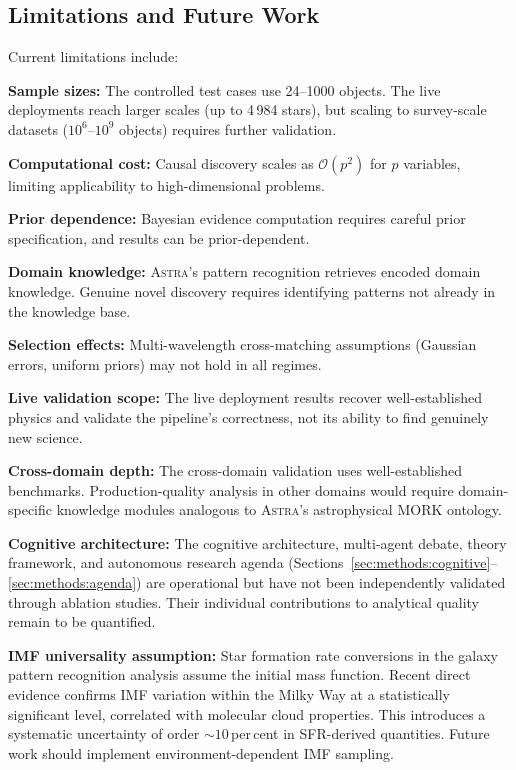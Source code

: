\documentclass[usenatbib]{rasti}
\newcommand{\astra}{\textsc{Astra}\xspace}
\begin{document}
\subsection{Limitations and Future Work}
\label{sec:discussion:limitations}

Current limitations include:
\begin{description}
  \item \textbf{Sample sizes:} The controlled test cases use 24--1000 objects. The live deployments reach larger scales (up to 4\,984 stars), but scaling to survey-scale datasets ($10^{6}$--$10^{9}$ objects) requires further validation.
  \item \textbf{Computational cost:} Causal discovery scales as $\mathcal{O}(p^2)$ for $p$ variables, limiting applicability to high-dimensional problems.
  \item \textbf{Prior dependence:} Bayesian evidence computation requires careful prior specification, and results can be prior-dependent.
  \item \textbf{Domain knowledge:} \astra's pattern recognition retrieves encoded domain knowledge. Genuine novel discovery requires identifying patterns not already in the knowledge base.
  \item \textbf{Selection effects:} Multi-wavelength cross-matching assumptions (Gaussian errors, uniform priors) may not hold in all regimes.
  \item \textbf{Live validation scope:} The live deployment results recover well-established physics and validate the pipeline's correctness, not its ability to find genuinely new science.
  \item \textbf{Cross-domain depth:} The cross-domain validation uses well-established benchmarks. Production-quality analysis in other domains would require domain-specific knowledge modules analogous to \astra's astrophysical MORK ontology.
  \item \textbf{Cognitive architecture:} The cognitive architecture, multi-agent debate, theory framework, and autonomous research agenda (Sections~\ref{sec:methods:cognitive}--\ref{sec:methods:agenda}) are operational but have not been independently validated through ablation studies. Their individual contributions to analytical quality remain to be quantified.
  \item \textbf{IMF universality assumption:} Star formation rate conversions in the galaxy pattern recognition analysis assume the \citet{Chabrier2003} initial mass function. Recent direct evidence \citep{Steinhardt2026} confirms IMF variation within the Milky Way at a statistically significant level, correlated with molecular cloud properties. This introduces a systematic uncertainty of order ${\sim}10$\,per\,cent in SFR-derived quantities. Future work should implement environment-dependent IMF sampling.

\end{description}
\end{document}
